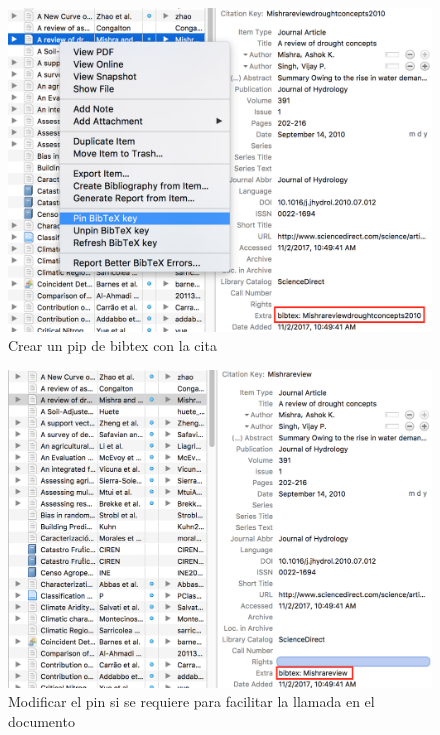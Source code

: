 \documentclass[10pt,]{article}
\begin{document}
\begin{figure}[!h]
\begin{center}
\includegraphics[width=\textwidth]{Figuras/zotero_pin.png}
\caption{Crear un pip de bibtex con la cita}
\label{etiqueta_figura3}
\end{center}
\end{figure}

\begin{figure}[!h]
\begin{center}
\includegraphics[width=\textwidth]{Figuras/zotero_pin2.png}
\caption{Modificar el pin si se requiere para facilitar la llamada en el documento}
\label{etiqueta_figura4}
\end{center}
\end{figure}
\end{document}
